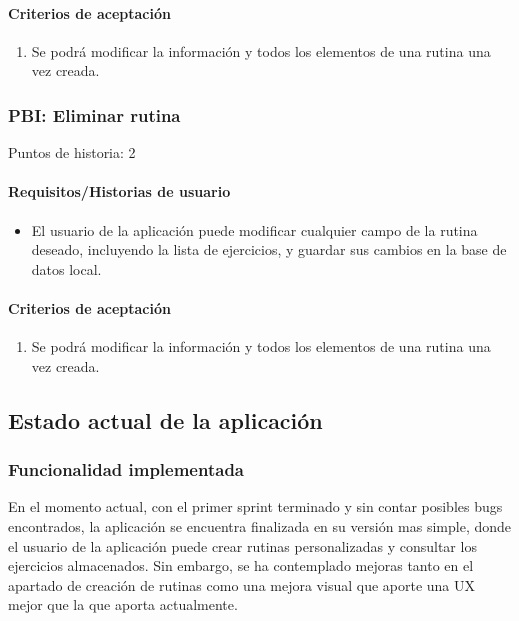 \documentclass[11pt,a4paper]{report}
\begin{document}
\paragraph{Criterios de aceptación}
\begin{enumerate}
	\item Se podrá modificar la información y todos los elementos de una rutina una vez creada.
\end{enumerate}
\subsubsection{PBI: Eliminar rutina} 
Puntos de historia: 2
\paragraph{Requisitos/Historias de usuario}
\begin{itemize}
	\item El usuario de la aplicación puede modificar cualquier campo de la rutina deseado, incluyendo la lista de ejercicios, y guardar sus cambios  en la base de datos local.
\end{itemize}
\paragraph{Criterios de aceptación}
\begin{enumerate}
	\item Se podrá modificar la información y todos los elementos de una rutina una vez creada.
\end{enumerate}
\subsection{Estado actual de la aplicación }
\subsubsection{Funcionalidad implementada}
En el momento actual, con el primer sprint terminado y sin contar posibles bugs encontrados, la aplicación se encuentra finalizada en su versión mas simple, donde el usuario de la aplicación puede crear rutinas personalizadas y consultar los ejercicios almacenados. Sin embargo, se ha contemplado mejoras tanto en el apartado de creación de rutinas como una mejora visual que aporte una UX mejor que la que aporta actualmente.
\end{document}

